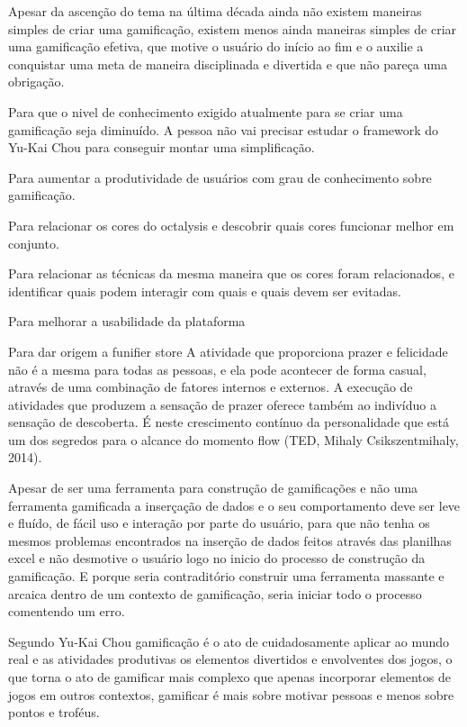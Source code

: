 Apesar da ascenção do tema na última década ainda não existem maneiras simples de criar uma gamificação, existem menos ainda maneiras simples de criar uma gamificação efetiva, que motive o usuário do início ao fim e o auxilie a  conquistar uma meta de maneira disciplinada e divertida e que não pareça uma obrigação.

Para que o nivel de conhecimento exigido atualmente para se criar uma gamificação seja diminuído. A pessoa não vai precisar estudar o framework do Yu-Kai Chou para conseguir montar uma simplificação.

Para aumentar a produtividade de usuários com grau de conhecimento sobre gamificação.

Para relacionar os cores do octalysis e descobrir quais cores funcionar melhor em conjunto.

Para relacionar as técnicas da mesma maneira que os cores foram relacionados, e identificar quais podem interagir com quais e quais devem ser evitadas.

Para melhorar a usabilidade da plataforma

Para dar origem a funifier store 
A atividade que proporciona prazer e felicidade não é a mesma para todas as pessoas, e ela pode acontecer de forma casual, através de uma combinação de fatores internos e externos. A execução de atividades que produzem a sensação de prazer oferece também ao indivíduo a sensação de descoberta. É neste crescimento contínuo da personalidade que está um dos segredos para o alcance do momento flow (TED, Mihaly Csikszentmihaly, 2014).

Apesar de ser uma ferramenta para construção de gamificações e não uma ferramenta gamificada a inserçação de dados e o seu comportamento deve ser leve e fluído, de fácil uso  e interação por parte do usuário, para que não tenha os mesmos problemas encontrados na inserção de dados feitos através das planilhas excel e não desmotive o usuário logo no inicio do processo de construção da gamificação. E porque seria contraditório construir uma ferramenta massante e arcaica dentro de um contexto de gamificação, seria iniciar todo o processo comentendo um erro.


Segundo Yu-Kai Chou \cite{arruda2007} gamificação é o ato de cuidadosamente aplicar ao mundo real e as atividades produtivas os elementos divertidos e envolventes dos jogos, o que torna o ato de gamificar mais complexo que apenas incorporar elementos de jogos em outros contextos, gamificar é mais sobre  motivar pessoas e menos sobre pontos e troféus. 

